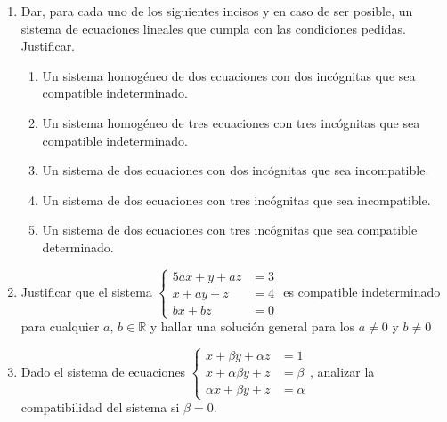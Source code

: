 \documentclass[11pt]{article}
\newcommand{\R}{\mathbb{R}}
\begin{document}
\begin{enumerate}[\hspace{-7mm} 1) ]
\begin{enumerate}
	\item El conjunto \(A=\left\{(x;y;z)=\left(k;\tfrac{11}{4}-\tfrac{5}{4}k;\tfrac{9}{4}+\tfrac{1}{4}k\right),k,\in\mathbb{R}\right\}\) sea solución del sistema \(
	\left \{
	\begin{array}{l}
		5x+4y=a \\
		x+y+z=b
	\end{array}
	\right .
	\) 
	
\end{enumerate}
\item Dar, para cada uno de los siguientes incisos y en caso de ser posible, un sistema de ecuaciones lineales que cumpla con las condiciones pedidas. Justificar.
\begin{enumerate}
	\item  Un sistema homogéneo de dos ecuaciones con dos incógnitas que sea compatible  indeterminado.
	\item Un sistema homogéneo de tres ecuaciones con tres incógnitas que sea compatible indeterminado.
	\item Un sistema de dos ecuaciones con dos incógnitas que sea incompatible.
	\item Un sistema de dos ecuaciones con tres incógnitas que sea incompatible.
	\item Un sistema de dos ecuaciones con tres incógnitas que sea compatible determinado.
\end{enumerate}

\item Justificar que el sistema $\left\{
    \begin{array}{rl}
    5a x +y + az  &= 3 \\
    x +ay +z &= 4 \\
    bx + bz &= 0 
    \end{array}\right.$ es compatible indeterminado para cualquier $a,\, b \in \R$ y hallar una solución general para los $a\neq 0$ y $b\neq 0$


\item Dado el sistema de ecuaciones $\left\{
    \begin{array}{rl}
    x + \beta y + \alpha z &= 1 \\
    x + \alpha \beta y + z &= \beta\\
    \alpha x + \beta y + z  &= \alpha 
    \end{array}\right.$, analizar la compatibilidad del sistema si $\beta=0$.
\end{enumerate}
\end{document}
